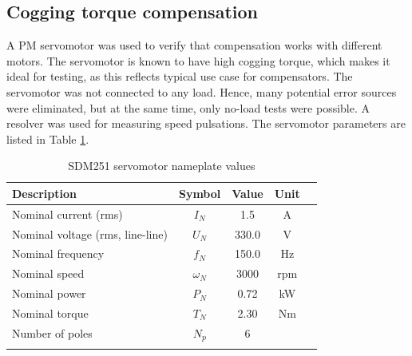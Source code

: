 \subsection{Cogging torque compensation}
A PM servomotor was used to verify that compensation works with different motors. The servomotor is known to have high cogging torque, which makes it ideal for testing, as this reflects typical use case for compensators. The servomotor was not connected to any load. Hence, many potential error sources were eliminated, but at the same time, only no-load tests were possible. A resolver was used for measuring speed pulsations. The servomotor parameters are listed in Table \ref{Tbl:SDM251}.

\begin{table}[ht]
\caption{SDM251 servomotor nameplate values}
\centering
\begin{tabular}[t]{lcccc}
\hline
Description & Symbol & Value & Unit\\
\hline
Nominal current (rms)  & $I_N$       & 1.5   & A\\
Nominal voltage (rms, line-line) & $U_N$       & 330.0 & V\\
Nominal frequency & $f_N$       & 150.0 & Hz\\
Nominal speed     & $\omega_N$  & 3000  & rpm\\
Nominal power     & $P_N$       & 0.72  & kW\\
Nominal torque    & $T_N$       & 2.30  & Nm\\
Number of poles   & $N_p$       & 6     & \\
\hline
\label{Tbl:SDM251}
\end{tabular}
\end{table}%


